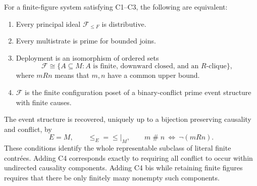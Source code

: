 \begin{theorem}\label{SA21-BM-event-iff}
For a finite-figure system satisfying C1--C3, the following are equivalent:
\begin{enumerate}
\item Every principal ideal \(\mathcal F_{\leq F}\) is distributive.
\item Every multistrate is prime for bounded joins.
\item Deployment is an isomorphism of ordered sets
\[
 \mathcal F\cong
 \{A\subseteq M:A\text{ is finite, downward closed, and an }R
   \text{-clique}\},
\]
where \(mRn\) means that \(m,n\) have a common upper bound.
\item \(\mathcal F\) is the finite configuration poset of a
binary-conflict prime event structure with finite causes.
\end{enumerate}
The event structure is recovered, uniquely up to a bijection
preserving causality and conflict, by
\[
 E=M,\qquad \leq_E=\leq|_M,\qquad
 m\mathbin{\#}n\ \Longleftrightarrow\ \neg(mRn).
\]
These conditions identify the whole representable subclass of
literal finite contrées. Adding C4 corresponds exactly to
requiring all conflict to occur within undirected causality
components. Adding C4 bis while retaining finite figures
requires that there be only finitely many nonempty such components.
\end{theorem}

